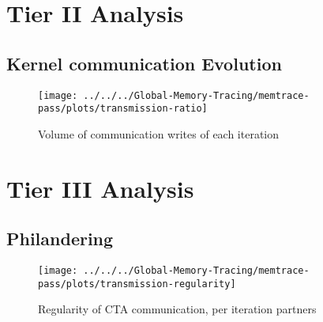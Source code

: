 \section{Tier II Analysis}
\subsection{Kernel communication Evolution}
\begin{figure}[t]
	\centering
	\texttt{[image: ../../../Global-Memory-Tracing/memtrace-pass/plots/transmission-ratio]}
	\caption{Volume of communication writes of each iteration}
	\label{trans-ratio}
\end{figure}
\newpage
\section{Tier III Analysis}
\subsection{Philandering}
\begin{figure}[t]
	\centering
		\texttt{[image: ../../../Global-Memory-Tracing/memtrace-pass/plots/transmission-regularity]}
	\caption{Regularity of CTA communication, per iteration partners}
	\label{trans-ratio}
\end{figure}
